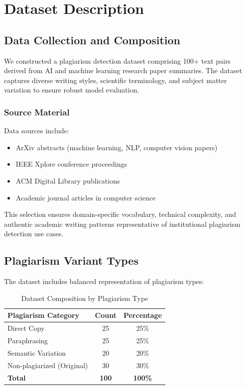 \section{Dataset Description} \label{sec:dataset}

\subsection{Data Collection and Composition}

We constructed a plagiarism detection dataset comprising 100+ text pairs derived from AI and machine learning research paper summaries. The dataset captures diverse writing styles, scientific terminology, and subject matter variation to ensure robust model evaluation.

\subsubsection{Source Material}

Data sources include:
\begin{itemize}
  \item ArXiv abstracts (machine learning, NLP, computer vision papers)
  \item IEEE Xplore conference proceedings
  \item ACM Digital Library publications
  \item Academic journal articles in computer science
\end{itemize}

This selection ensures domain-specific vocabulary, technical complexity, and authentic academic writing patterns representative of institutional plagiarism detection use cases.

\subsection{Plagiarism Variant Types}

The dataset includes balanced representation of plagiarism types:

\begin{table}[h!]
\centering
\caption{Dataset Composition by Plagiarism Type}
\label{tab:dataset_composition}
\begin{tabular}{|l|c|c|}
\hline
\textbf{Plagiarism Category} & \textbf{Count} & \textbf{Percentage} \\
\hline
Direct Copy & 25 & 25\% \\
Paraphrasing & 25 & 25\% \\
Semantic Variation & 20 & 20\% \\
Non-plagiarized (Original) & 30 & 30\% \\
\hline
\textbf{Total} & \textbf{100} & \textbf{100\%} \\
\hline
\end{tabular}
\end{table}

